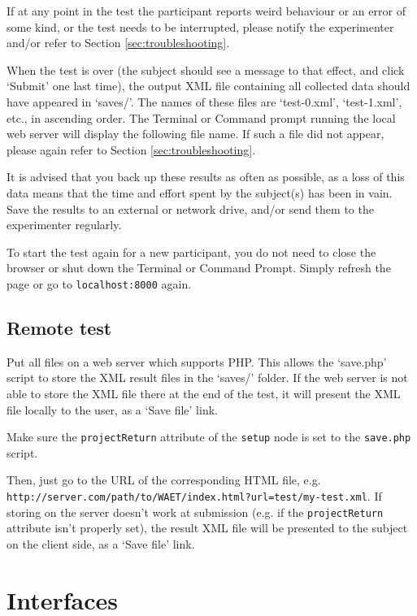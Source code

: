 \documentclass[11pt, oneside]{article}   	%
\begin{document}
        If at any point in the test the participant reports weird behaviour or an error of some kind, or the test needs to be interrupted, please notify the experimenter and/or refer to Section \ref{sec:troubleshooting}. 
		
		When the test is over (the subject should see a message to that effect, and click `Submit' one last time), the output XML file containing all collected data should have appeared in `saves/'. The names of these files are `test-0.xml', `test-1.xml', etc., in ascending order. The Terminal or Command prompt running the local web server will display the following file name. If such a file did not appear, please again refer to Section \ref{sec:troubleshooting}. 
		
		It is advised that you back up these results as often as possible, as a loss of this data means that the time and effort spent by the subject(s) has been in vain. Save the results to an external or network drive, and/or send them to the experimenter regularly. 
		
		To start the test again for a new participant, you do not need to close the browser or shut down the Terminal or Command Prompt. Simply refresh the page or go to \texttt{localhost:8000} again. 
		

	\subsection{Remote test}
		Put all files on a web server which supports PHP. This allows the `save.php' script to store the XML result files in the `saves/' folder. If the web server is not able to store the XML file there at the end of the test, it will present the XML file locally to the user, as a `Save file' link. 

		Make sure the \texttt{projectReturn} attribute of the \texttt{setup} node is set to the \texttt{save.php} script. 

		Then, just go to the URL of the corresponding HTML file, e.g. \texttt{http://server.com/path/to/WAET/index.html?url=test/my-test.xml}. If storing on the server doesn't work at submission (e.g. if the \texttt{projectReturn} attribute isn't properly set), the result XML file will be presented to the subject on the client side, as a `Save file' link. 


\clearpage

\section{Interfaces}
\end{document}

